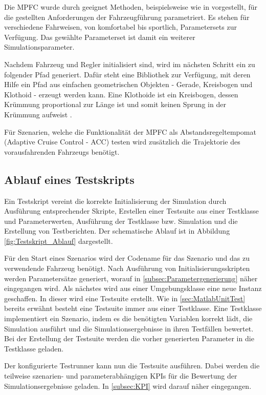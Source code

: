 Die MPFC wurde durch geeignet Methoden, beispielsweise wie in \cite{math11020465} vorgestellt, für die gestellten Anforderungen der Fahrzeugführung parametriert. Es stehen für verschiedene Fahrweisen, von komfortabel bis sportlich, Parametersets zur Verfügung. Das gewählte Parameterset ist damit ein weiterer Simulationsparameter.

Nachdem Fahrzeug und Regler initialisiert sind, wird im nächsten Schritt ein zu folgender Pfad generiert. Dafür steht eine Bibliothek zur Verfügung, mit deren Hilfe ein Pfad aus einfachen geometrischen Objekten - Gerade, Kreisbogen und Klothoid - erzeugt werden kann. Eine Klothoide ist ein Kreisbogen, dessen Krümmung proportional zur Länge ist und somit keinen Sprung in der Krümmung aufweist \cite{klothoidWiki}.

Für Szenarien, welche die Funktionalität der MPFC als Abstandsregeltempomat (Adaptive Cruise Control - ACC) testen wird zusätzlich die Trajektorie des vorausfahrenden Fahrzeugs benötigt.

\subsection{Ablauf eines Testskripts} \label{subsec:Testskript}
Ein Testskript vereint die korrekte Initialisierung der Simulation durch Ausführung entsprechender Skripte, Erstellen einer Testsuite aus einer Testklasse und Parameterwerten, Ausführung der Testklasse bzw. Simulation und die Erstellung von Testberichten. Der schematische Ablauf ist in Abbildung \ref{fig:Testskript_Ablauf} dargestellt.\medskip

\noindent Für den Start eines Szenarios wird der Codename für das Szenario und das zu verwendende Fahrzeug benötigt. Nach Ausführung von Initialisierungsskripten werden Parametersätze generiert, worauf in \ref{subsec:Parametergenerierung} näher eingegangen wird. Als nächstes wird aus einer Umgebungsklasse eine neue Instanz geschaffen. In dieser wird eine Testsuite erstellt. Wie in \ref{sec:MatlabUnitTest} bereits erwähnt besteht eine Testsuite immer aus einer Testklasse. Eine Testklasse implementiert ein Szenario, indem es die benötigten Variablen korrekt lädt, die Simulation ausführt und die Simulationsergebnisse in ihren Testfällen bewertet. Bei der Erstellung der Testsuite werden die vorher generierten Parameter in die Testklasse geladen.\medskip

\noindent Der konfigurierte Testrunner kann nun die Testsuite ausführen. Dabei werden die teilweise szenarien- und parameterabhängigen KPIs für die Bewertung der Simulationsergebnisse geladen. In \ref{subsec:KPI} wird darauf näher eingegangen.\medskip

